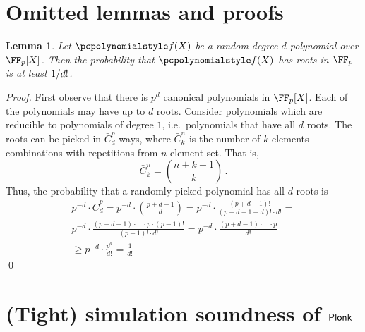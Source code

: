 \let\accentvec\vec \documentclass[runningheads,10pt]{llncs}
\newtheorem{lemma}[theorem]{Lemma}
\begin{document}
	\section{Omitted lemmas and proofs}
	\begin{lemma}
			\label{lem:root_prob}
			Let $\p{f}(X)$ be a random degree-$d$ polynomial over $\FF_p[X]$. Then
			the probability that $\p{f}(X)$ has roots in $\FF_p$ is at least
			$1 / d!$.
	\end{lemma}
	\begin{proof}
			First observe that there is $p^{d}$ canonical polynomials in $\FF_p[X]$.
			Each of the polynomials may have up to $d$ roots. Consider polynomials
			which are reducible to polynomials of degree $1$, i.e.~polynomials that
			have all $d$ roots. The roots can be picked in $\bar{C}^{p}_{d}$
			ways, where $\bar{C}^{n}_{k}$ is the number of
			$k$-elements combinations with 
			repetitions from $n$-element set. That is,
			\[
					\bar{C}^n_k = \binom{n + k - 1}{k}\,.
			\]
			Thus, the probability that a randomly picked polynomial has all $d$
			roots is 
			\begin{multline*}
			p^{-d} \cdot \bar{C}^p_d = p^{-d} \cdot \binom{p + d - 1}{d} =
					 p^{-d} \cdot \frac{(p + d - 1)!}{(p + d - 1 - d)! \cdot d!} = \\
					 p^{-d} \cdot \frac{(p + d - 1) \cdot \ldots \cdot p \cdot (p -
						 1)!}{(p - 1)! \cdot d!} =  p^{-d} \cdot \frac{(p + d - 1)\cdot
							 \ldots \cdot p}{d!} \\
					 \geq  p^{-d} \cdot {\frac{p^d}{d!}} = \frac{1}{d!}
			\end{multline*}
			\qed
	\end{proof}

	\section{(Tight) simulation soundness of $\textnormal{\textsf{Plonk}}$}
\end{document}
